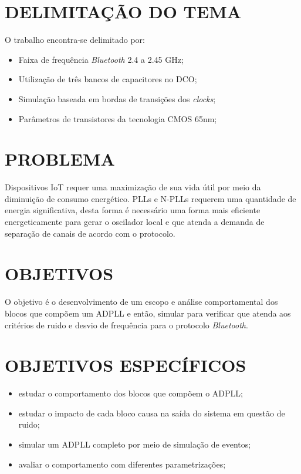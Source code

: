 \section{DELIMITAÇÃO DO TEMA} 
O trabalho encontra-se delimitado por:

\begin{itemize}
	\item Faixa de frequência \textit{Bluetooth} 2.4 a 2.45 GHz;
	\item Utilização de três bancos de capacitores no DCO;
	\item Simulação baseada em bordas de transições dos \textit{clocks};
	\item Parâmetros de transistores da tecnologia CMOS 65nm;
\end{itemize}

\section{PROBLEMA}
Dispositivos IoT requer uma maximização de sua vida útil por meio da diminuição de consumo energético. PLLs e N-PLLs requerem uma quantidade de energia significativa, desta forma é necessário uma forma mais eficiente energeticamente para gerar o oscilador local e que atenda a demanda de separação de canais de acordo com o protocolo.

\section{OBJETIVOS}
O objetivo é o desenvolvimento de um escopo e análise comportamental dos blocos que compõem um ADPLL e então, simular para verificar que atenda aos critérios de ruido e desvio de frequência para o protocolo \textit{Bluetooth}.
\section{OBJETIVOS ESPECÍFICOS}
\begin{itemize}
	\item estudar o comportamento dos blocos que compõem o ADPLL;
	\item estudar o impacto de cada bloco causa na saída do sistema em questão de ruido;
	\item simular um ADPLL completo por meio de simulação de eventos;
	\item avaliar o comportamento com diferentes parametrizações;
\end{itemize}










